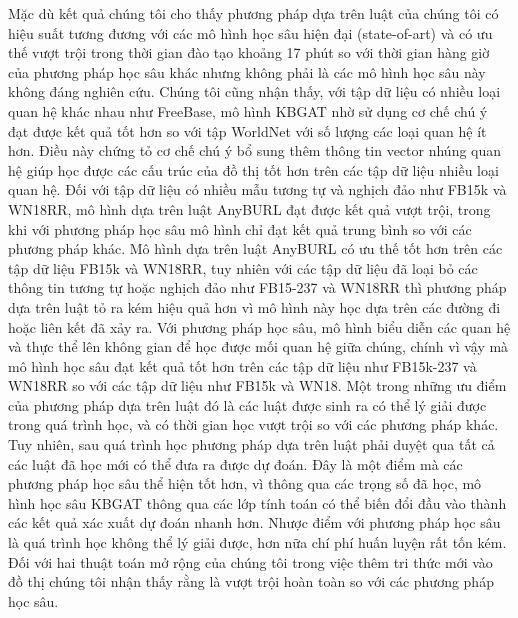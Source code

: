 Mặc dù kết quả chúng tôi cho thấy phương pháp dựa trên luật của chúng tôi có hiệu suất tương đương với các mô hình học sâu hiện đại (state-of-art) và có ưu thế vượt trội trong thời gian đào tạo khoảng 17 phút so với thời gian hàng giờ của phương pháp học sâu khác nhưng không phải là các mô hình học sâu này không đáng nghiên cứu. Chúng tôi cũng nhận thấy, với tập dữ liệu có nhiều loại quan hệ khác nhau như FreeBase, mô hình KBGAT nhờ sử dụng cơ chế chú ý đạt được kết quả tốt hơn so với tập WorldNet với số lượng các loại quan hệ ít hơn.
Điều này chứng tỏ cơ chế chú ý bổ sung thêm thông tin vector nhúng quan hệ giúp học được các cấu trúc của đồ thị tốt hơn trên các tập dữ liệu nhiều loại quan hệ.
Đối với tập dữ liệu có nhiều mẫu tương tự và nghịch đảo như FB15k và WN18RR, mô hình dựa trên luật AnyBURL đạt được kết quả vượt trội, trong khi với phương pháp học sâu mô hình chỉ đạt kết quả trung bình so với các phương pháp khác.
Mô hình dựa trên luật AnyBURL có ưu thế tốt hơn trên các tập dữ liệu FB15k và WN18RR, tuy nhiên với các tập dữ liệu đã loại bỏ các thông tin tương tự hoặc nghịch đảo như FB15-237 và WN18RR thì phương pháp dựa trên luật tỏ ra kém hiệu quả hơn vì mô hình này học dựa trên các đường đi hoặc liên kết đã xảy ra. Với phương pháp học sâu, mô hình biểu diễn các quan hệ và thực thể lên không gian để học được mối quan hệ giữa chúng, chính vì vậy mà mô hình học sâu đạt kết quả tốt hơn trên các tập dữ liệu như FB15k-237 và WN18RR so với các tập dữ liệu như FB15k và WN18.
Một trong những ưu điểm của phương pháp dựa trên luật đó là các luật được sinh ra có thể lý giải được trong quá trình học, và có thời gian học vượt trội so với các phương pháp khác. Tuy nhiên, sau quá trình học phương pháp dựa trên luật phải duyệt qua tất cả các luật đã học mới có thể đưa ra được dự đoán. Đây là một điểm mà các phương pháp học sâu thể hiện tốt hơn, vì thông qua các trọng số đã học, mô hình học sâu KBGAT thông qua các lớp tính toán có thể biến đổi đầu vào thành các kết quả xác xuất dự đoán nhanh hơn. Nhược điểm với phương pháp học sâu là quá trình học không thể lý giải được, hơn nữa chí phí huấn luyện rất tốn kém. Đối với hai thuật toán mở rộng của chúng tôi trong việc thêm tri thức mới vào đồ thị chúng tôi nhận thấy rằng là vượt trội hoàn toàn so với các phương pháp học sâu.

